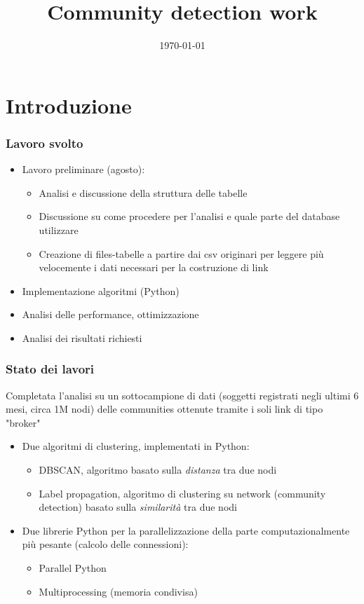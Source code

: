 \documentclass{beamer}
\title{Community detection work}
\institute{MHPC}
\date{\today}
\begin{document}
\begin{frame}
 \titlepage
\end{frame}
\section{Introduzione}
\frame{\sectionpage}
\begin{frame}
 \frametitle{Lavoro svolto}
  \begin{itemize}
  \item Lavoro preliminare (agosto):
  \begin{itemize}
  \item Analisi e discussione della struttura delle tabelle
  \item Discussione su come procedere per l'analisi e quale parte del database utilizzare
  \item Creazione di files-tabelle a partire dai csv originari per leggere più velocemente i dati necessari per la costruzione di link 
  \end{itemize}
  \item Implementazione algoritmi (Python)
  \item Analisi delle performance, ottimizzazione
  \item Analisi dei risultati richiesti
  \end{itemize}
\end{frame}

\begin{frame}
 \frametitle{Stato dei lavori}
 Completata l'analisi su un sottocampione di dati (soggetti registrati negli ultimi 6 mesi, circa 1M nodi) delle communities ottenute tramite i soli link di tipo "broker"
  \begin{itemize}
  \item Due algoritmi di clustering, implementati in Python:
  \begin{itemize}
  \item DBSCAN, algoritmo basato sulla \textit{distanza} tra due nodi
  \item Label propagation, algoritmo di clustering su network (community detection) basato sulla \textit{similarit\`{a}} tra due nodi
  \end{itemize}
  \item Due librerie Python per la parallelizzazione della parte computazionalmente pi\`{u} pesante (calcolo delle connessioni):
  \begin{itemize}
  \item Parallel Python
  \item Multiprocessing (memoria condivisa)
  \end{itemize}
  \end{itemize}
\end{frame}
\end{document}

